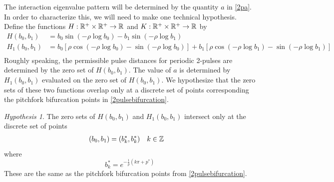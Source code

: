 \documentclass[11pt,reqno]{amsart}
\theoremstyle{plain}
\theoremstyle{definition}
\theoremstyle{remark}
\newtheorem{remark}[theorem]{Remark}
\newtheorem{hypothesis}[theorem]{Hypothesis}
\begin{document}
The interaction eigenvalue pattern will be determined by the quantity $a$ in \cref{2pa}. In order to characterize this, we will need to make one technical hypothesis. Define the functions $H: \mathbb{R}^+ \times \mathbb{R}^+ \rightarrow \mathbb{R}$ and $K: \mathbb{R}^+ \times \mathbb{R}^+ \rightarrow \mathbb{R}$ by 
\begin{align}
H(b_0, b_1) &= b_0 \sin \left( -\rho \log b_0 \right) - b_1 \sin \left( -\rho \log b_1 \right) \label{perdefH} \\
H_1(b_0, b_1) &= b_0 \left[ \rho \cos \left( -\rho \log b_0 \right) - \sin \left( -\rho \log b_0 \right) \right] + b_1 \left[ \rho \cos \left( -\rho \log b_1 \right) - \sin \left( -\rho \log b_1 \right) \right]  \label{perdefH1} \\
\end{align}
Roughly speaking, the permissible pulse distances for periodic 2-pulses are determined by the zero set of $H(b_0, b_1)$. 
The value of $a$ is determined by $H_1(b_0, b_1)$ evaluated on the zero set of $H(b_0, b_1)$. We hypothesize that the zero sets of these two functions overlap only at a discrete set of points corresponding the pitchfork bifurcation points in \cref{2pulsebifurcation}.

\begin{hypothesis}\label{Hoverlaphyp}
The zero sets of $H(b_0, b_1)$ and $H_1(b_0, b_1)$ intersect only at the discrete set of points
\begin{align*}
(b_0, b_1) &= (b_k^*, b_k^*) && k \in \mathbb{Z}
\end{align*}
where 
\begin{equation*}
b^*_k = e^{-\frac{1}{\rho} (k \pi + p^*) }
\end{equation*}
These are the same as the pitchfork bifurcation points from \cref{2pulsebifurcation}.
\end{hypothesis}


\end{document}
